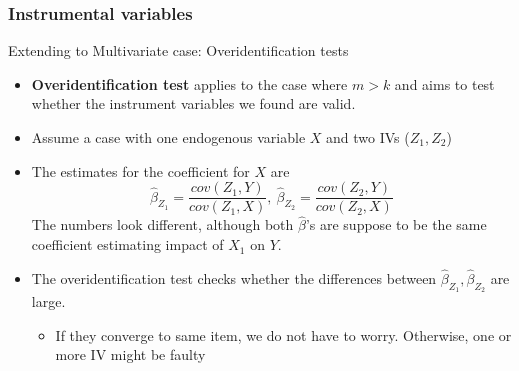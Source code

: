 \documentclass[compress]{beamer}
\begin{document}
\begin{frame}
\frametitle{Instrumental variables}
Extending to Multivariate case: Overidentification tests
\begin{itemize}
\item \textbf{Overidentification test} applies to the case where $m>k$ and aims to test whether the instrument variables we found are valid. 
\item Assume a case with one endogenous variable $X$ and two IVs ($Z_1, Z_2$)
\item The estimates for the coefficient for $X$ are 
\[
\hat{\beta}_{Z_1}=\frac{cov(Z_1,Y)}{cov(Z_1,X)}, \ \hat{\beta}_{Z_2}=\frac{cov(Z_2,Y)}{cov(Z_2,X)}
\]
The numbers look different, although both $\hat{\beta}$'s are suppose to be the same coefficient estimating impact of $X_1$ on $Y$. 
\item The overidentification test checks whether the differences between $\hat{\beta}_{Z_1}, \hat{\beta}_{Z_2}$ are large.
\begin{itemize}
\item If they converge to same item, we do not have to worry. Otherwise, one or more IV might be faulty
\end{itemize}
\end{itemize}
\end{frame}

\end{document}
